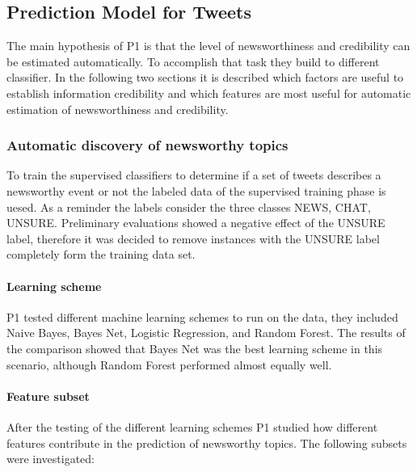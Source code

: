 \documentclass{proseminar}
\begin{document}
\subsection{Prediction Model for Tweets}
The main hypothesis of P1 is that the level of newsworthiness and credibility can be estimated automatically. To accomplish that task they build to different classifier. In the following two sections it is described which factors are useful to establish  information credibility and which features are most useful for automatic estimation of newsworthiness and credibility.


\subsubsection*{Automatic discovery of newsworthy topics}
To train the supervised classifiers to determine if a set of tweets describes a newsworthy event or not the labeled data of the supervised training phase is uesed. As a reminder the labels consider the three classes NEWS, CHAT, UNSURE. Preliminary evaluations showed a negative effect of the UNSURE label, therefore it was decided to remove instances with the UNSURE label completely form the training data set.

\paragraph{Learning scheme}
P1 tested different machine learning schemes to run on the data, they included Naive Bayes, Bayes Net, Logistic Regression, and Random Forest. The results of the comparison showed that Bayes Net was the best learning scheme in this scenario, although Random Forest performed almost equally well.

\paragraph{Feature subset}
After the testing of the different learning schemes P1 studied how different features  contribute in the prediction of newsworthy topics.
The following subsets were investigated:
\end{document}
